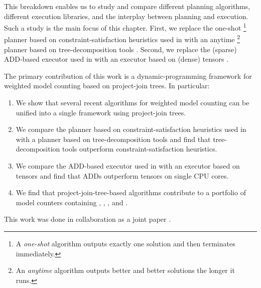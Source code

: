 This breakdown enables us to study and compare different planning algorithms, different execution libraries, and the interplay between planning and execution.
Such a study is the main focus of this chapter. 
First, we replace the one-shot%
\footnote{A \emph{one-shot} algorithm outputs exactly one solution and then terminates immediately.}
planner based on constraint-satisfaction heuristics \cite{dechter03} used in  \cite{DPV20,phan2019weighted} with an anytime%
\footnote{An \emph{anytime} algorithm outputs better and better solutions the longer it runs.} planner based on tree-decomposition tools \cite{MPPV04,AMW17,HS18,Tamaki17}.
Second, we replace the (sparse) ADD-based executor \cite{bahar1997algebraic} used in  \cite{DPV20,phan2019weighted} with an executor based on (dense) tensors \cite{KKCLA17}.

The primary contribution of this work is a dynamic-programming framework for weighted model counting based on project-join trees.
In particular:
\begin{enumerate}
    \item We show that several recent algorithms for weighted model counting \cite{DPV20,fichte2020exploiting} can be unified into a single framework using project-join trees.
    \item We compare the planner based on constraint-satisfaction heuristics \cite{dechter03} used in  \cite{DPV20,phan2019weighted} with a planner based on tree-decomposition tools \cite{robertson1984graph,AMW17,HS18,Tamaki17} and find that tree-decomposition tools outperform constraint-satisfaction heuristics.
    \item We compare the ADD-based executor \cite{bahar1997algebraic} used in  \cite{DPV20,phan2019weighted} with an executor based on tensors \cite{KKCLA17} and find that ADDs outperform tensors on single CPU cores.
    \item We find that project-join-tree-based algorithms contribute to a portfolio of model counters containing \cachet{} \cite{sang2004combining}, \ctd{} \cite{darwiche2004new}, \df{} \cite{LM17}, and \minictd{} \cite{OD15}.
\end{enumerate}
This work was done in collaboration as a joint paper \cite{dudek2020dpmc}.

